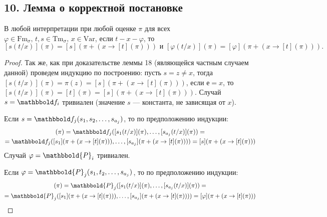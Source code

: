 \documentclass[a4paper, fleqn]{article}
\begin{document}



    \setcounter{section}{2}
    \subsection*{10. Лемма о корректной постановке}
    \begin{lemma}[73]
        В любой интерпретации при любой оценке $\pi$ для всех $\varphi \in \text{Fm}_{\sigma}, \, t, s \in \text{Tm}_{\sigma}, \, x \in \text{Var}$, если $t-x-\varphi$, то \\[-10 pt]
        \[ [s(t/x)](\pi) = [s](\pi + (x \to [t](\pi))) \text{ и } [\varphi(t/x)](\pi) = [\varphi](\pi + (x \to [t](\pi))). \]
    \end{lemma}
    
    \begin{proof}
        Так же, как при доказательстве леммы 18 (являющейся частным случаем данной) проведем индукцию по построению: пусть $s = z \ne x$, тогда $[s(t/x)](\pi) = \pi(z) = [s](\pi + (x \to [t](\pi)))$, если $е = x$, то $[s(t/x)](\pi) = [t](\pi) = [s](\pi + (x \to [t](\pi)))$. Случай $s = \F_i$ тривиален (значение $s$ --- константа, не зависящая от $x$).
        
        Если $s = \F_j(s_1, s_2, \ldots, s_{a_j})$, то по предположению индукции:
        \begin{multline*}
            [s(t/x)](\pi) = \F_j([s_1(t/x)](\pi), \ldots, [s_{a_j}(t/x)](\pi)) = \\
            = \F_j([s_1](\pi + (x \to [t](\pi))), \ldots, [s_{a_j}](\pi + (x \to [t](\pi)))) = [s](\pi + (x \to [t](\pi)))
        \end{multline*}
        Случай $\varphi = \mathbbold{P}_i$ тривиален.
        
        Если $\varphi = \mathbbold{P}_j(s_1, t_2, \ldots, s_{a_j})$, то по предположению индукции:
        \begin{multline*}
            [\varphi(t/x)](\pi) = \mathbbold{P}_j([s_1(t/x)](\pi), \ldots, [s_{a_j}(t/x)](\pi)) = \\
            = \mathbbold{P}_j([s_1](\pi + (x \to [t](\pi))), \ldots, [s_{a_j}](\pi + (x \to [t](\pi)))) = [\varphi](\pi + (x \to [t](\pi)))
        \end{multline*}
    \end{proof}













\end{document}
